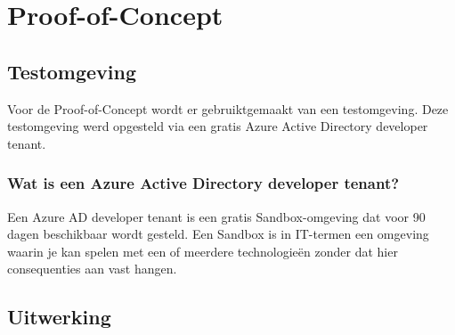 
\chapter{Proof-of-Concept}%
\label{ch:poc}



\lipsum[78-80]

\section{Testomgeving}

Voor de Proof-of-Concept wordt er gebruiktgemaakt van een testomgeving. Deze testomgeving werd opgesteld via een gratis Azure Active Directory developer tenant. 

\subsection{Wat is een Azure Active Directory developer tenant?}

Een Azure \ac{AD} developer tenant is een gratis Sandbox-omgeving dat voor 90 dagen beschikbaar wordt gesteld. Een Sandbox is in IT-termen een omgeving waarin je kan spelen met een of meerdere technologieën zonder dat hier consequenties aan vast hangen.  





\section{Uitwerking}

\lipsum[76-80]